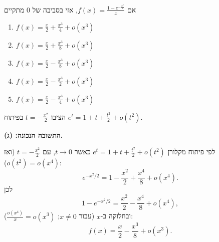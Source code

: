 
\begin{question}
אם $f(x)=\frac{1-e^{-\frac{x^2}{2}}}{x}$, אזי בסביבה של $0$ מתקיים
\begin{enumerate}
  \item[(א)] $f(x)=\frac{x}{2}+\frac{x^3}{4}+o(x^3)$
  \item[(ב)] $f(x)=\frac{x}{2}+\frac{x^3}{8}+o(x^3)$
  \item[(ג)] $f(x)=\frac{x}{2}-\frac{x^3}{8}+o(x^3)$
  \item[(ד)] $f(x)=\frac{x}{2}-\frac{x^3}{2}+o(x^3)$
  \item[(ה)] $f(x)=\frac{x}{2}-\frac{x^3}{4}+o(x^3)$
\end{enumerate}
\end{question}

\begin{hint}
הציבו $t=-\frac{x^2}{2}$ בפיתוח $e^t=1+t+\frac{t^2}{2}+o(t^2)$.
\end{hint}

\begin{solution}
\textbf{התשובה הנכונה: (ג).}

לפי פיתוח מקלורן $e^t=1+t+\frac{t^2}{2}+o(t^2)$ כאשר $t\to0$, עם $t=-\frac{x^2}{2}$ (ואז $o(t^2)=o(x^4)$):
\[ e^{-x^2/2} = 1-\frac{x^2}{2}+\frac{x^4}{8}+o(x^4). \]
לכן
\[ 1-e^{-x^2/2} = \frac{x^2}{2}-\frac{x^4}{8}+o(x^4), \]
ובחלוקה ב-$x$ (עבור $x\neq0$; $\frac{o(x^4)}{x}=o(x^3)$):
\[ f(x)=\frac{x}{2}-\frac{x^3}{8}+o(x^3). \]
\end{solution}
